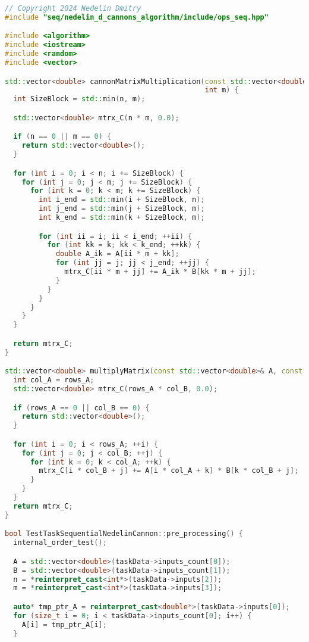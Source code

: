 \documentclass{report}
\begin{document}
\begin{lstlisting}[language=C++,caption=Последовательная версия]
// Copyright 2024 Nedelin Dmitry
#include "seq/nedelin_d_cannons_algorithm/include/ops_seq.hpp"

#include <algorithm>
#include <iostream>
#include <random>
#include <vector>

std::vector<double> cannonMatrixMultiplication(const std::vector<double>& A, const std::vector<double>& B, int n,
                                               int m) {
  int SizeBlock = std::min(n, m);

  std::vector<double> mtrx_C(n * m, 0.0);

  if (n == 0 || m == 0) {
    return std::vector<double>();
  }

  for (int i = 0; i < n; i += SizeBlock) {
    for (int j = 0; j < m; j += SizeBlock) {
      for (int k = 0; k < m; k += SizeBlock) {
        int i_end = std::min(i + SizeBlock, n);
        int j_end = std::min(j + SizeBlock, m);
        int k_end = std::min(k + SizeBlock, m);

        for (int ii = i; ii < i_end; ++ii) {
          for (int kk = k; kk < k_end; ++kk) {
            double A_ik = A[ii * m + kk];
            for (int jj = j; jj < j_end; ++jj) {
              mtrx_C[ii * m + jj] += A_ik * B[kk * m + jj];
            }
          }
        }
      }
    }
  }

  return mtrx_C;
}

std::vector<double> multiplyMatrix(const std::vector<double>& A, const std::vector<double>& B, int rows_A, int col_B) {
  int col_A = rows_A;
  std::vector<double> mtrx_C(rows_A * col_B, 0.0);

  if (rows_A == 0 || col_B == 0) {
    return std::vector<double>();
  }

  for (int i = 0; i < rows_A; ++i) {
    for (int j = 0; j < col_B; ++j) {
      for (int k = 0; k < col_A; ++k) {
        mtrx_C[i * col_B + j] += A[i * col_A + k] * B[k * col_B + j];
      }
    }
  }
  return mtrx_C;
}

bool TestTaskSequentialNedelinCannon::pre_processing() {
  internal_order_test();

  A = std::vector<double>(taskData->inputs_count[0]);
  B = std::vector<double>(taskData->inputs_count[1]);
  n = *reinterpret_cast<int*>(taskData->inputs[2]);
  m = *reinterpret_cast<int*>(taskData->inputs[3]);

  auto* tmp_ptr_A = reinterpret_cast<double*>(taskData->inputs[0]);
  for (size_t i = 0; i < taskData->inputs_count[0]; i++) {
    A[i] = tmp_ptr_A[i];
  }


\end{lstlisting}
\end{document}
